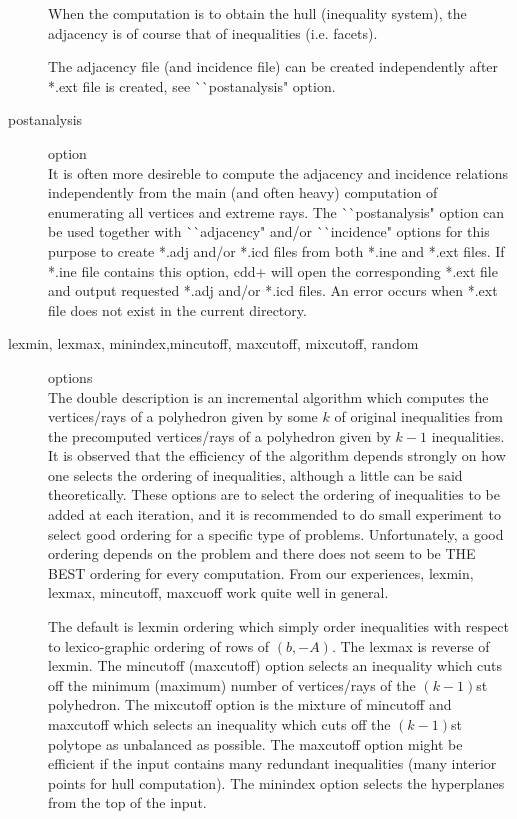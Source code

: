 \begin{description}
When the computation is to obtain the hull (inequality system),
the adjacency is of course that of inequalities (i.e. facets).

The adjacency file (and incidence file) can be created independently
after *.ext file is created, see ^^ ^^ postanalysis" option.

\item[postanalysis] option\\
It is often more desireble to compute the adjacency and incidence relations
independently from the main (and often heavy) computation of enumerating all vertices
and extreme rays.  The ^^ ^^ postanalysis" option can be used together
with ^^ ^^ adjacency" and/or ^^ ^^ incidence" options for this purpose  
to create *.adj and/or *.icd files from both *.ine and *.ext files.
If *.ine file contains this option, cdd+ will open the
corresponding *.ext file and output requested *.adj and/or *.icd files.
An error occurs when *.ext file does not exist in the current
directory.

\item[lexmin, lexmax, minindex,mincutoff, maxcutoff, mixcutoff, random] options\\
The double description is an incremental algorithm which
computes the vertices/rays of a polyhedron given by some $k$ of
original inequalities from the precomputed vertices/rays of a
polyhedron given by $k-1$ inequalities.  It is observed that
the efficiency of the algorithm depends strongly on how
one selects the ordering of inequalities, although a little
can be said theoretically.
These options are to select the ordering of inequalities to be
added at each iteration, and it is recommended to do small
experiment to select good ordering for a specific type of problems.
Unfortunately, a good ordering depends on the problem and there does not seem 
to be THE BEST ordering for every computation.  From our experiences,
lexmin, lexmax, mincutoff, maxcuoff work quite well in general.

The default is lexmin ordering which simply order inequalities
with respect to lexico-graphic ordering of rows of $(b, -A)$.  The lexmax
is reverse of lexmin.  The mincutoff (maxcutoff) option selects an inequality which
cuts off the minimum (maximum) number of vertices/rays of the $(k-1)$st polyhedron. 
The mixcutoff option is the mixture of mincutoff and maxcutoff which selects
an inequality which cuts off the $(k-1)$st polytope as unbalanced as possible.
The maxcutoff option might be efficient if the input contains
many redundant inequalities (many interior points for hull computation).
The minindex option selects the hyperplanes from the top of
the input.


\end{description}

